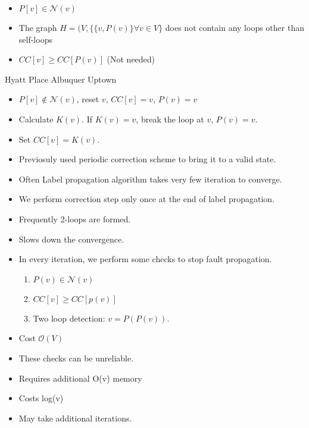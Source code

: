 \lyxframeend{}


\begin{itemize}
\item $P[v] \in \mathcal{N}(v)$
\item The graph $H=(V, \{\{v,P(v)\}\forall v \in V\} $ does not contain any loops other than self-loops
\item $CC[v] \geq CC[P(v)] $ (Not needed)
\end{itemize}


\lyxframeend{}


Hyatt Place Albuquer Uptown
\begin{itemize}
\item $P[v] \notin \mathcal{N}(v)$, reset $v$, $CC[v]=v$, $P(v)=v$
\item Calculate $K(v)$. If $K(v)=v$, break the loop at $v$, $P(v)=v$.
\item Set $CC[v] = K(v)$.
\end{itemize}


\begin{itemize}
\item Previosuly used periodic correction scheme to bring it to a valid state.
\item Often Label propagation algorithm takes very few iteration to converge.
\item We perform correction step only once at the end of label propagation.
\end{itemize}

\lyxframeend{}



\begin{itemize}
\item Frequently 2-loops are formed. 
\item Slows down the convergence.
\end{itemize}


\begin{itemize}
\item In every iteration, we perform some checks to stop fault propagation.
\begin{enumerate}
	\item $P(v) \in \mathcal{N}(v)$
	\item $CC[v] \geq CC[p(v)]$
	\item Two loop detection: $v = P(P(v))$.
\end{enumerate} 


\item Cost $\mathcal{O}(V)$ 
\item These checks can be unreliable.
\end{itemize}

\lyxframeend{}



\begin{itemize}
\item Requires additional O(v) memory
\item Costs log(v)
\item May take additional iterations.
\end{itemize}

\lyxframeend{}

